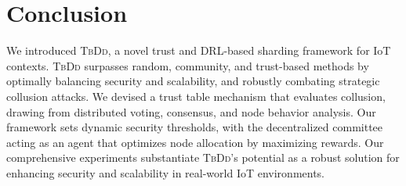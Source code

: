 \section{Conclusion}
\label{section: conclusion}
We introduced \textsc{TbDd}, a novel trust and DRL-based sharding framework for IoT contexts. \textsc{TbDd} surpasses random, community, and trust-based methods by optimally balancing security and scalability, and robustly combating strategic collusion attacks. We devised a trust table mechanism that evaluates collusion, drawing from distributed voting, consensus, and node behavior analysis. Our framework sets dynamic security thresholds, with the decentralized committee acting as an agent that optimizes node allocation by maximizing rewards. Our comprehensive experiments substantiate \textsc{TbDd}'s potential as a robust solution for enhancing security and scalability in real-world IoT environments.


